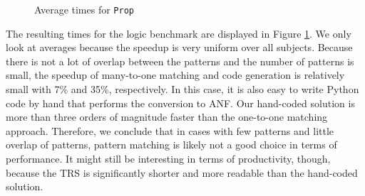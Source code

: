 \documentclass[conference,compsoc]{IEEEtran}
\begin{document}


\begin{figure}[h]
    \centering
    \vspace{-\baselineskip}
    \caption{Average times for \texttt{Prop}}\label{fig:prop-times}
\end{figure}

The resulting times for the logic benchmark are displayed in Figure \ref{fig:prop-times}.
We only look at averages because the speedup is very uniform over all subjects.
Because there is not a lot of overlap between the patterns and the number of patterns is small, the speedup of many-to-one matching and code generation is relatively small with 7\% and 35\%, respectively.
In this case, it is also easy to write Python code by hand that performs the conversion to ANF.
Our hand-coded solution is more than three orders of magnitude faster than the one-to-one matching approach.
Therefore, we conclude that in cases with few patterns and little overlap of patterns, pattern matching is likely not a good choice in terms of performance.
It might still be interesting in terms of productivity, though, because the TRS is significantly shorter and more readable than the hand-coded solution.
\end{document}
